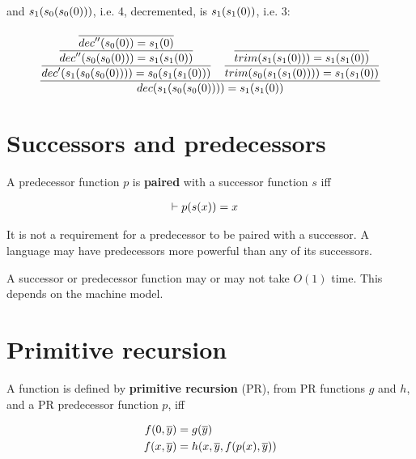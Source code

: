 and $s_1\mathopen{}\left({s_0\mathopen{}\left({s_0\mathopen{}\left({0}\right)\mathclose{}}\right)\mathclose{}}\right)\mathclose{}$, i.e. 4, decremented, is $s_1\mathopen{}\left({s_1\mathopen{}\left({0}\right)\mathclose{}}\right)\mathclose{}$, i.e. $3$:

$$
\judgement{
  \judgement{
    \judgement{
      \axiom{
        dec''\p{s_0\p{0}} = s_1\p{0}
      }
    }{
      dec''\p{s_0\p{s_0\p{0}}} = s_1\p{s_1\p{0}}
    }
  }{
    dec'\p{s_1\p{s_0\p{s_0\p{0}}}} = s_0\p{s_1\p{s_1\p{0}}}
  }
  \quad
  \judgement{
    \axiom{
      trim\p{s_1\p{s_1\p{0}}} = s_1\p{s_1\p{0}}
    }
  }{
    trim\p{s_0\p{s_1\p{s_1\p{0}}}} = s_1\p{s_1\p{0}}
  }
}{
  dec\p{s_1\p{s_0\p{s_0\p{0}}}} = s_1\p{s_1\p{0}}
}
$$

\section{Successors and predecessors}

\begin{definition}

A predecessor function $p$ is \textbf{paired} with a successor function $s$ iff

\begin{align}
\vdash p\mathopen{}\left({s\mathopen{}\left({x}\right)\mathclose{}}\right)\mathclose{} &= x
\end{align}

\end{definition}

It is not a requirement for a predecessor to be paired with a successor. A
language may have predecessors more powerful than any of its successors.

\begin{remark}

A successor or predecessor function may or may not take $O(1)$ time. This
depends on the machine model.

\end{remark}

\section{Primitive recursion}

\begin{definition}

A function is defined by \textbf{primitive recursion} (PR), from PR functions
$g$ and $h$, and a PR predecessor function $p$, iff

\begin{align}
f\mathopen{}\left({0,\overline{y}}\right)\mathclose{} &= g\mathopen{}\left({\overline{y}}\right)\mathclose{} \\
f\mathopen{}\left({x, \overline{y}}\right)\mathclose{} &= h\mathopen{}\left({x, \overline{y}, f\mathopen{}\left({p\mathopen{}\left({x}\right)\mathclose{},\overline{y}}\right)\mathclose{}}\right)\mathclose{}
\end{align}

\end{definition}

